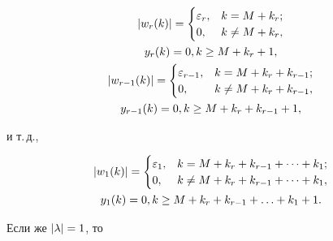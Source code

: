 \begin{gather}


|w_r(k)| =


\begin{cases}


\ve_r, & k = M + k_r;\\


0, & k \neq M + k_r,


\end{cases}


\\


%


y_r(k) = 0, k \geq M+k_r+1, \notag \\


%


|w_{r-1}(k)| =


\begin{cases}


\ve_{r-1}, & k = M + k_r+k_{r-1};\\


0, & k \neq M + k_r+k_{r-1},


\end{cases}


\\


%


y_{r-1}(k) = 0, k \geq M+k_r+k_{r-1}+1,\notag


\end{gather}


и т.\,д.,


\begin{gather}


|w_1(k)| =


\begin{cases}


\ve_1, & k = M + k_r+k_{r-1}+\dotsb+k_1;\\


0, & k \neq M + k_r+k_{r-1}+\dotsb+k_1,


\end{cases}


\\


y_1(k) = 0, k \geq M+k_r+k_{r-1}+\dotsc+k_1+1.\notag


\end{gather}


Если же $|{\lambda}| = 1$, то


